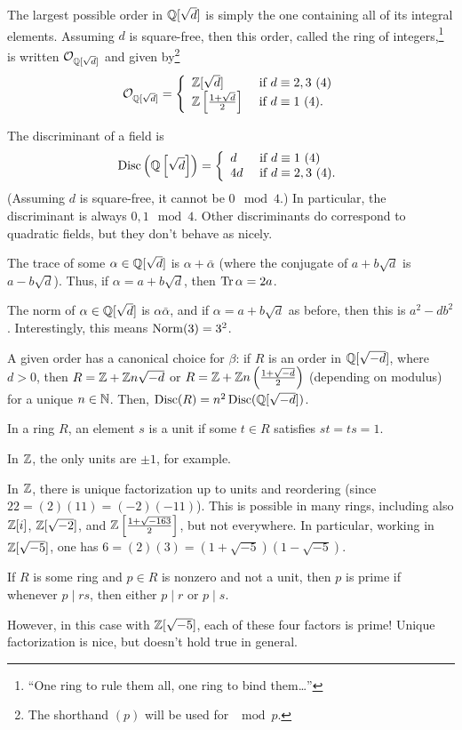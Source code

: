 The largest possible order in $\mathbb{Q}[\sqrt{d}]$ is simply the one containing all of its integral elements. Assuming $d$ is square-free, then this order, called the ring of integers,\footnote{``One ring to rule them all, one ring to bind them\dots''} is written $\mathcal{O}_{\mathbb{Q}[\sqrt{d}]}$ and given by\footnote{The shorthand $(p)$ will be used for $\mod p$.}
\[
\cO_{\Q[\sqrt{d}]} = \left\{
\begin{array}{l l}
\Z[\sqrt{d}] & \text{ if } d\equiv 2,3\ (4)\\
\Z\left[\frac{1+\sqrt{d}}{2}\right] & \text{ if } d\equiv 1\ (4).
\end{array}
\right.%
\]
\begin{defn}
The discriminant of a field is 
\[
\Disc\left(\Q\left[\sqrt{d}\right]\right) = \left\{
\begin{array}{l l}
d & \text{ if } d\equiv 1\ (4)\\
4d& \text{ if } d\equiv 2,3\ (4).
\end{array}\right.%
\]
(Assuming $d$ is square-free, it cannot be $0\mod 4$.) In particular, the discriminant is always $0,1\mod 4$. Other discriminants do correspond to quadratic fields, but they don't behave as nicely.
\end{defn}
\begin{defn}
The trace of some $\alpha\in\mathbb{Q}[\sqrt{d}]$ is $\alpha +\bar\alpha$ (where the conjugate of $a + b\sqrt{d}$ is $a - b\sqrt{d}$). Thus, if $\alpha = a + b\sqrt{d}$, then $\operatorname{Tr} \alpha = 2a$.
\end{defn}
\begin{defn}
The norm of $\alpha\in\mathbb{Q}[\sqrt{d}]$ is $\alpha\bar\alpha$, and if $\alpha = a+b\sqrt d$ as before, then this is $a^2-db^2$. Interestingly, this means $\operatorname{Norm}(3) = 3^2$.
\end{defn}
A given order has a canonical choice for $\beta$: if $R$ is an order in $\mathbb{Q}[\sqrt{-d}]$, where $d > 0$, then $R = \mathbb{Z} + \mathbb{Z} n\sqrt{-d}$ or $R = \mathbb{Z} + \mathbb{Z} n \left(\frac{1+\sqrt{-d}}{2}\right)$ (depending on modulus) for a unique $n\in\mathbb{N}$. Then, $\operatorname{Disc}(R) = n^2\operatorname{Disc}(\mathbb{Q}[\sqrt{-d}])$.

\begin{defn}
In a ring $R$, an element $s$ is a unit if some $t\in R$ satisfies $st = ts = 1$.
\end{defn}
In $\mathbb{Z}$, the only units are $\pm 1$, for example.

In $\mathbb{Z}$, there is unique factorization up to units and reordering (since $22 = (2)(11) = (-2)(-11)$). This is possible in many rings, including also $\mathbb{Z}[i]$, $\mathbb{Z}[\sqrt{-2}]$, and $\mathbb{Z}\left[\frac{1+\sqrt{-163}}{2}\right]$, but not everywhere. In particular, working in $\mathbb{Z}[\sqrt{-5}]$, one has $6 = (2)(3) = (1+\sqrt{-5})(1-\sqrt{-5})$.
\begin{defn}
If $R$ is some ring and $p\in R$ is nonzero and not a unit, then $p$ is prime if whenever $p\mid rs$, then either $p\mid r$ or $p\mid s$.
\end{defn}
However, in this case with $\mathbb{Z}[\sqrt{-5}]$, each of these four factors is prime! Unique factorization is nice, but doesn't hold true in general.

